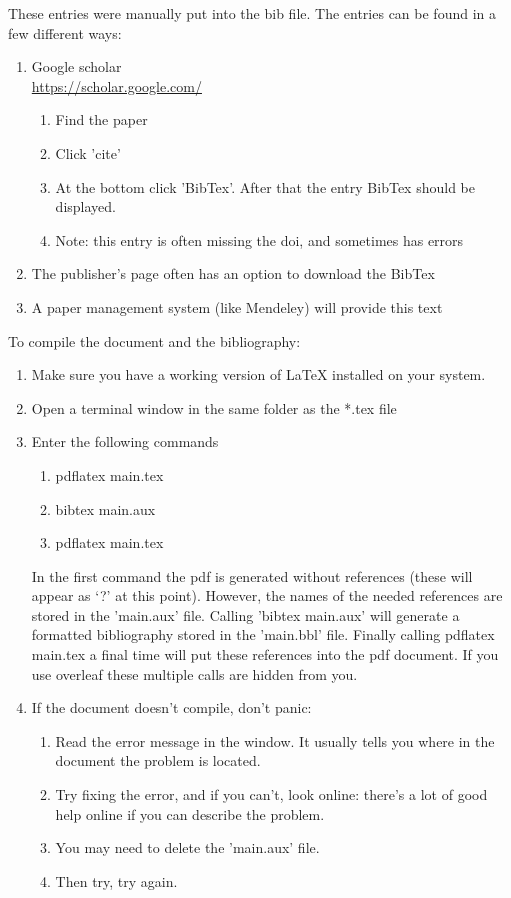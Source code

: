 \documentclass[11pt,twocolumn,a4paper]{article}
\begin{document}
These entries were manually put into the bib file. The entries can be found in a few different ways:
\begin{enumerate}
\item Google scholar\\ \url{https://scholar.google.com/}
\begin{enumerate}
    \item Find the paper
    \item Click 'cite'
    \item At the bottom click 'BibTex'. After that the entry BibTex should be displayed.
    \item Note: this entry is often missing the doi, and sometimes has errors
\end{enumerate}    
\item The publisher's page often has an option to download the BibTex 
\item A paper management system (like Mendeley) will provide this text
\end{enumerate}    

To compile the document and the bibliography:

\begin{enumerate}
\item Make sure you have a working version of \LaTeX{} installed on your system.    
\item Open a terminal window in the same folder as the *.tex file
\item Enter the following commands
\begin{enumerate}
    \item pdflatex main.tex
    \item bibtex main.aux
    \item pdflatex main.tex    
\end{enumerate}    
In the first command the pdf is generated without references (these will appear as `?' at this point). However, the names of the needed references are stored in the 'main.aux' file. Calling 'bibtex main.aux' will generate a formatted bibliography stored in the 'main.bbl' file. Finally calling pdflatex main.tex a final time will put these references into the pdf document. If you use overleaf these multiple calls are hidden from you.
\item If the document doesn't compile, don't panic:
\begin{enumerate}
    \item Read the error message in the window. It usually tells you where in the document the problem is located.
    \item Try fixing the error, and if you can't, look online: there's a lot of good help online if you can describe the problem.
    \item You may need to delete the 'main.aux' file. 
    \item Then try, try again.
\end{enumerate}
\end{enumerate}    
\end{document}
